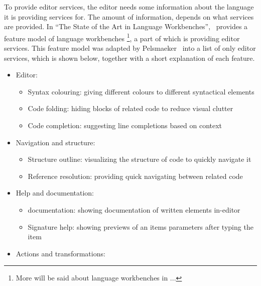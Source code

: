 To provide editor services, the editor needs some information about the language it is providing services for.
The amount of information, depends on what services are provided.
In ``The State of the Art in Language Workbenches'',~\autocite{ErdwegSV13} provides a feature model of language workbenches
\footnote{More will be said about language workbenches in ...}, a part of which is providing editor services.
This feature model was adapted by Pelsmaeker~\autocite{Pelsmaeker2018} into a list of only editor services, which is shown
below, together with a short explanation of each feature.

\begin{itemize}
    \setlength\itemsep{-1em}
    \item Editor:
    \begin{itemize}
        \vspace{-2\topsep}
        \setlength\itemsep{-0.3em}
        \item Syntax colouring: giving different colours to different syntactical elements
        \item Code folding: hiding blocks of related code to reduce visual clutter
        \item Code completion: suggesting line completions based on context
    \end{itemize}
    \item Navigation and structure:
    \begin{itemize}
        \vspace{-2\topsep}
        \setlength\itemsep{-0.3em}
        \item Structure outline: visualizing the structure of code to quickly navigate it
        \item Reference resolution: providing quick navigating between related code
    \end{itemize}
    \item Help and documentation:
    \begin{itemize}
        \vspace{-2\topsep}
        \setlength\itemsep{-0.3em}
        \item documentation: showing documentation of written elements in-editor
        \item Signature help: showing previews of an items parameters after typing the item
    \end{itemize}
    \item Actions and transformations:
    \begin{itemize}

\end{itemize}
\end{itemize}
